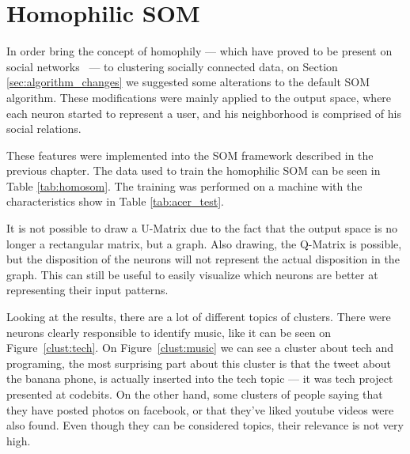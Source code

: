 \section{Homophilic SOM}
\label{sec:homophilic_som}
In order bring the concept of homophily --- which have proved to be present on social networks~\cite[]{Wehrens2007}  --- to clustering socially connected data, on Section \ref{sec:algorithm_changes} we suggested some alterations to the default \ac{SOM} algorithm. These modifications were mainly applied to the output space, where each neuron started to represent a user, and his neighborhood is comprised of his social relations.

These features were implemented into the \ac{SOM} framework described in the previous chapter. The data used to train the homophilic \ac{SOM} can be seen in Table \ref{tab:homosom}. The training was performed on a machine with the characteristics show in Table \ref{tab:acer_test}.




It is not possible to draw a \ac{U-Matrix} due to the fact that the output space is no longer a rectangular matrix, but a graph. Also drawing, the \ac{Q-Matrix} is possible, but the disposition of the neurons will not represent the actual disposition in the graph. This can still be useful to easily visualize which neurons are better at representing their input patterns. 

Looking at the results, there are a lot of different topics of clusters. There were neurons clearly responsible to identify music, like it can be seen on Figure~\ref{clust:tech}. On Figure~\ref{clust:music} we can see a cluster about tech and programing, the most surprising part about this cluster is that the tweet about the banana phone, is actually inserted into the tech topic --- it was tech project presented at codebits. 
On the other hand, some clusters of people saying that they have posted photos on facebook, or that they've liked youtube videos were also found. Even though they can be considered topics, their relevance is not very high.

